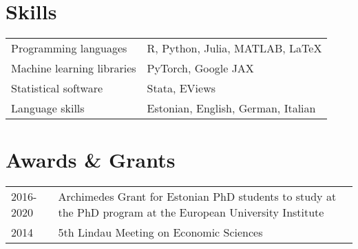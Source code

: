 \documentclass[a4, 11pt]{article}
\begin{document}
    \section*{Skills}\begin{table}[H]
    \begin{tabular}{p{2cm}p{14cm}}
        Programming languages & R, Python, Julia, MATLAB, LaTeX \\
        Machine learning libraries & PyTorch, Google JAX \\
        Statistical software & Stata, EViews \\
        Language skills & Estonian, English, German, Italian \\
    \end{tabular}
  \end{table}


    \section*{Awards \& Grants}
  \begin{table}[H]
      \begin{tabular}{p{2cm}p{14cm}}
          2016-2020 & {Archimedes Grant for Estonian PhD students}{} to study at the PhD program at the European University Institute\\
          2014 & {5th Lindau Meeting on Economic Sciences}{}\\
      \end{tabular}
    \end{table}

    
\end{document}
